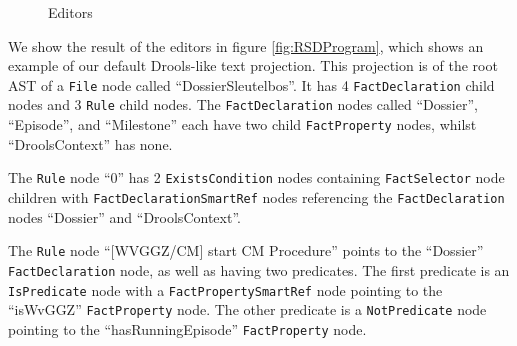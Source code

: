 \begin{figure}
    \centering
    \caption{Editors}
    \label{fig:RSDEditors}
\end{figure}

\newpage

We show the result of the editors in figure \ref{fig:RSDProgram}, which shows an example of our default Drools-like text projection. 
This projection is of the root AST of a \texttt{File} node called ``DossierSleutelbos''.
It has 4 \texttt{FactDeclaration} child nodes and 3 \texttt{Rule} child nodes.
The \texttt{FactDeclaration} nodes called ``Dossier'', ``Episode'', and ``Milestone'' each have two child \texttt{FactProperty} nodes, whilst ``DroolsContext'' has none.

The \texttt{Rule} node ``0'' has 2 \texttt{ExistsCondition} nodes containing \texttt{FactSelector} node children with \texttt{FactDeclarationSmartRef} nodes referencing the \texttt{FactDeclaration} nodes ``Dossier'' and ``DroolsContext''.

The \texttt{Rule} node ``[WVGGZ/CM] start CM Procedure'' points to the ``Dossier'' \texttt{FactDeclaration} node, as well as having two predicates.
The first predicate is an \texttt{IsPredicate} node with a \texttt{FactPropertySmartRef} node pointing to the ``isWvGGZ'' \texttt{FactProperty} node.
The other predicate is a \texttt{NotPredicate} node pointing to the ``hasRunningEpisode'' \texttt{FactProperty} node.

